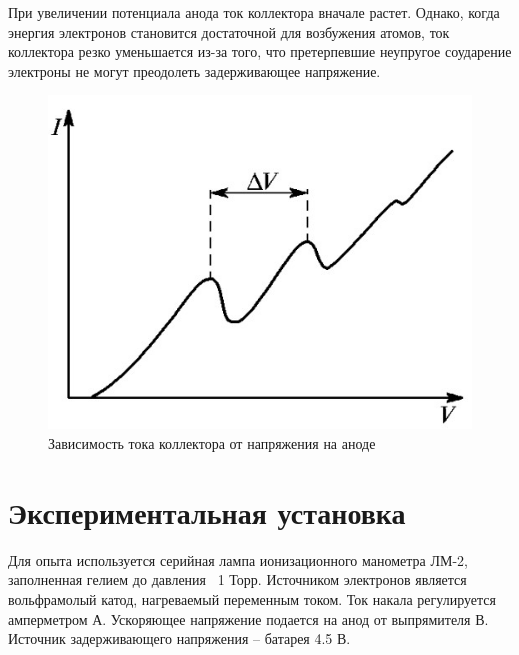 \documentclass[14pt, a4paper]{report}
\begin{document}
При увеличении потенциала анода ток коллектора вначале растет. Однако, когда энергия электронов становится достаточной для возбужения атомов, ток коллектора резко уменьшается из-за того, что претерпевшие неупругое соударение электроны не могут преодолеть задерживающее напряжение.

\begin{figure}[H]
\centering
\includegraphics[scale=0.6]{../images/521-2}
\caption{Зависимость тока коллектора от напряжения на аноде}
\end{figure}

\section{Экспериментальная установка}

Для опыта используется серийная лампа ионизационного манометра ЛМ-2, заполненная гелием до давления ~1 Торр. Источником электронов является вольфрамолый катод, нагреваемый переменным током. Ток накала регулируется амперметром А. Ускоряющее напряжение подается на анод от выпрямителя В. Источник задерживающего напряжения -- батарея 4.5 В.
\end{document}
